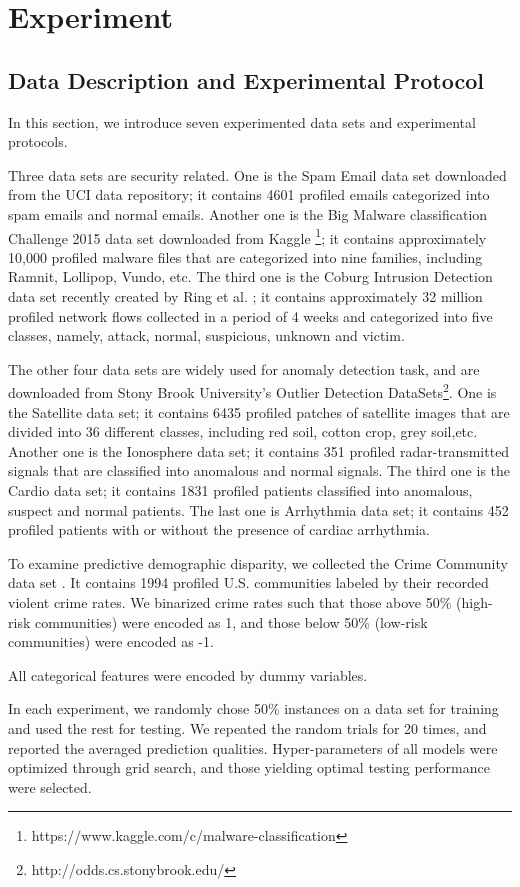 \section{Experiment}

\subsection{Data Description and Experimental Protocol}

In this section, we introduce seven experimented data sets 
and experimental protocols.

Three data sets are security related. One is the Spam Email 
data set downloaded from the UCI data repository; 
it contains 4601 profiled emails categorized into spam emails 
and normal emails. Another one is the Big Malware 
classification Challenge 2015 data set downloaded 
from Kaggle 
\footnote{https://www.kaggle.com/c/malware-classification}; 
it contains approximately 10,000 profiled malware files that 
are categorized into nine families, including Ramnit, 
Lollipop, Vundo, etc. The third one is the Coburg Intrusion Detection data set recently created by Ring et al. 
\cite{ring2017flow}; it contains approximately 
32 million profiled network flows collected in a 
period of 4 weeks and categorized into five classes, 
namely, attack, normal, suspicious, unknown and victim. 

The other four data sets are widely used for anomaly 
detection task, and are downloaded from Stony Brook 
University's Outlier Detection DataSets\footnote{http://odds.cs.stonybrook.edu/}. 
One is the Satellite data set; it contains 6435 
profiled patches of satellite images that are divided 
into 36 different classes, including red soil, cotton crop, 
grey soil,etc. Another one is the Ionosphere data set; 
it contains 351 profiled radar-transmitted signals that 
are classified into anomalous and normal signals. 
The third one is the Cardio data set; it contains 1831 
profiled patients classified into anomalous, suspect and 
normal patients. The last one is Arrhythmia data set; 
it contains 452 profiled patients with or without the 
presence of cardiac arrhythmia. 

To examine predictive demographic disparity, we 
collected the Crime Community data set \cite{redmond2002data}. 
It contains 1994 profiled U.S. communities 
labeled by their recorded violent crime rates. 
We binarized crime rates such that those above 50\% (high-risk 
communities) were encoded as 1, and those below 50\% (low-risk communities) were encoded as -1. 

All categorical features were encoded by dummy variables. 

In each experiment, we randomly chose 50\% instances on 
a data set for training and used the rest for testing. 
We repeated the random trials for 20 times, and reported 
the averaged prediction qualities. Hyper-parameters of 
all models were optimized through grid search, 
and those yielding optimal testing performance were selected. 

